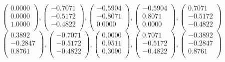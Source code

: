 \documentclass[
  utf8,%
  parskip,%
  largesmallcaps,intlimits,widermath,%
  sharecounter,nobreak,definition=marks,%
  noparts%
]{rtthesis}
\begin{document}
\begin{equation*}
\begin{pmatrix}
0.0000\\
0.0000\\
1.0000\\
\end{pmatrix}
,
\begin{pmatrix}
-0.7071\\
-0.5172\\
-0.4822\\
\end{pmatrix}
,
\begin{pmatrix}
-0.5904\\
-0.8071\\
0.0000\\
\end{pmatrix}
,
\begin{pmatrix}
-0.5904\\
0.8071\\
0.0000\\
\end{pmatrix}
,
\begin{pmatrix}
0.7071\\
-0.5172\\
-0.4822\\
\end{pmatrix}
\end{equation*}
\begin{equation*}
\begin{pmatrix}
0.3892\\
-0.2847\\
0.8761\\
\end{pmatrix}
,
\begin{pmatrix}
-0.7071\\
-0.5172\\
-0.4822\\
\end{pmatrix}
,
\begin{pmatrix}
0.0000\\
0.9511\\
0.3090\\
\end{pmatrix}
,
\begin{pmatrix}
0.7071\\
-0.5172\\
-0.4822\\
\end{pmatrix}
,
\begin{pmatrix}
-0.3892\\
-0.2847\\
0.8761\\
\end{pmatrix}
\end{equation*}
\end{document}
